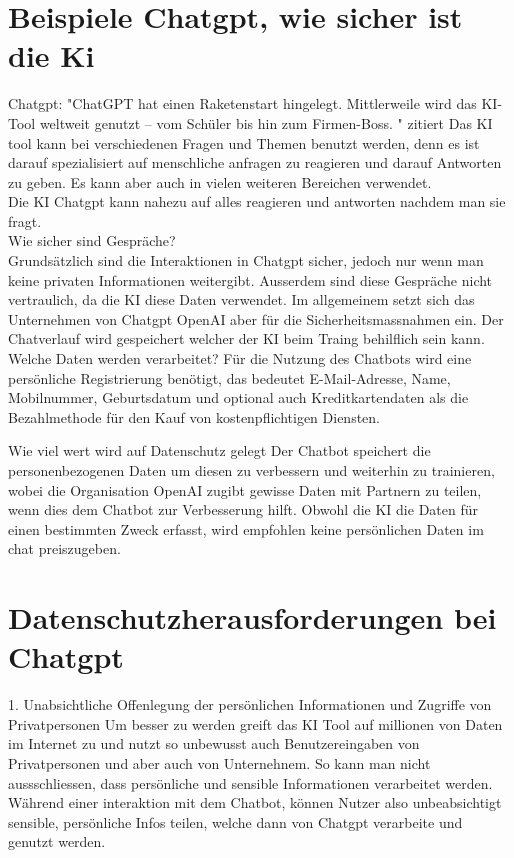 \documentclass{report}
\begin{document}
\section {Beispiele Chatgpt, wie sicher ist die Ki}
Chatgpt: "ChatGPT hat einen Raketenstart hingelegt. Mittlerweile wird das KI-Tool weltweit genutzt – vom Schüler bis hin zum Firmen-Boss. " zitiert
    Das KI tool kann bei verschiedenen Fragen und Themen benutzt werden, denn es ist darauf spezialisiert auf menschliche anfragen zu reagieren und darauf Antworten zu geben. 
    Es kann aber auch in vielen weiteren Bereichen verwendet.\\
    Die KI Chatgpt kann nahezu auf alles reagieren und antworten nachdem man sie fragt. 
\\
    Wie sicher sind Gespräche? \\
    Grundsätzlich sind die Interaktionen in Chatgpt sicher, jedoch nur wenn man keine privaten Informationen weitergibt. Ausserdem sind diese Gespräche nicht vertraulich, da die KI diese Daten verwendet.
    Im allgemeinem setzt sich das Unternehmen von Chatgpt OpenAI aber für die Sicherheitsmassnahmen ein.
    Der Chatverlauf wird gespeichert welcher der KI beim Traing behilflich sein kann.
    Welche Daten werden verarbeitet? 
    Für die Nutzung des Chatbots wird eine persönliche Registrierung benötigt, das bedeutet E-Mail-Adresse, Name, Mobilnummer, Geburtsdatum und optional auch Kreditkartendaten als die Bezahlmethode für den Kauf von kostenpflichtigen Diensten.

    Wie viel wert wird auf Datenschutz gelegt
    Der Chatbot speichert die personenbezogenen Daten um diesen zu verbessern und weiterhin zu trainieren, wobei die Organisation OpenAI zugibt gewisse Daten mit Partnern zu teilen, wenn dies dem Chatbot zur Verbesserung hilft.
    Obwohl die KI die Daten für einen bestimmten Zweck erfasst, wird empfohlen keine persönlichen Daten im chat preiszugeben.

\section*{Datenschutzherausforderungen bei Chatgpt}
1. Unabsichtliche Offenlegung der persönlichen Informationen und Zugriffe von Privatpersonen
Um besser zu werden greift das KI Tool auf millionen von Daten im Internet zu und nutzt so unbewusst auch Benutzereingaben von Privatpersonen und aber auch von Unternehnem.
So kann man nicht aussschliessen, dass persönliche und sensible Informationen verarbeitet werden.
Während einer interaktion mit dem Chatbot, können Nutzer also unbeabsichtigt sensible, persönliche Infos teilen, welche dann von Chatgpt verarbeite und genutzt werden. 
\end{document}
